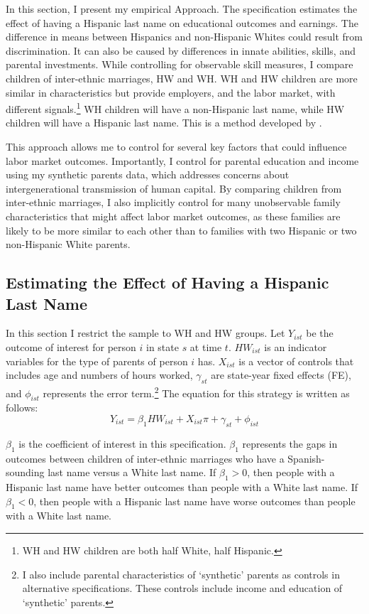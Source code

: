 In this section, I present my empirical Approach. The specification estimates the effect of having a Hispanic last name on educational outcomes and earnings. The difference in means between Hispanics and non-Hispanic Whites could result from discrimination. It can also be caused by differences in innate abilities, skills, and parental investments. While controlling for observable skill measures, I compare children of inter-ethnic marriages, HW and WH. WH and HW children are more similar in characteristics but provide employers, and the labor market, with different signals.\footnote{WH and HW children are both half White, half Hispanic.} WH children will have a non-Hispanic last name, while HW children will have a Hispanic last name. This is a method developed by \textcite{rubinstein2014pride}.

This approach allows me to control for several key factors that could influence labor market outcomes. Importantly, I control for parental education and income using my synthetic parents data, which addresses concerns about intergenerational transmission of human capital. By comparing children from inter-ethnic marriages, I also implicitly control for many unobservable family characteristics that might affect labor market outcomes, as these families are likely to be more similar to each other than to families with two Hispanic or two non-Hispanic White parents.

\subsection{Estimating the Effect of Having a Hispanic Last Name}

In this section I restrict the sample to WH and HW groups. Let $Y_{ist}$ be the outcome of interest for person $i$ in state $s$ at time $t$. $HW_{ist}$ is an indicator variables for the type of parents of person $i$ has. $X_{ist}$ is a vector of controls that includes age and numbers of hours worked, $\gamma_{st}$ are state-year fixed effects (FE), and $\phi_{ist}$ represents the error term.\footnote{I also include parental characteristics of `synthetic' parents as controls in alternative specifications. These controls include income and education of `synthetic' parents.} The equation for this strategy is written as follows:
\begin{equation} \label{eq:1a}
Y_{ist} = \beta_{1} HW_{ist} + X_{ist} \pi + \gamma_{st} + \phi_{ist}
\end{equation}

$\beta_{1}$ is the coefficient of interest in this specification. $\beta_{1}$ represents the gaps in outcomes between children of inter-ethnic marriages who have a Spanish-sounding last name versus a White last name. If $\beta_{1} > 0$, then people with a Hispanic last name have better outcomes than people with a White last name. If $\beta_{1} < 0$, then people with a Hispanic last name have worse outcomes than people with a White last name.

